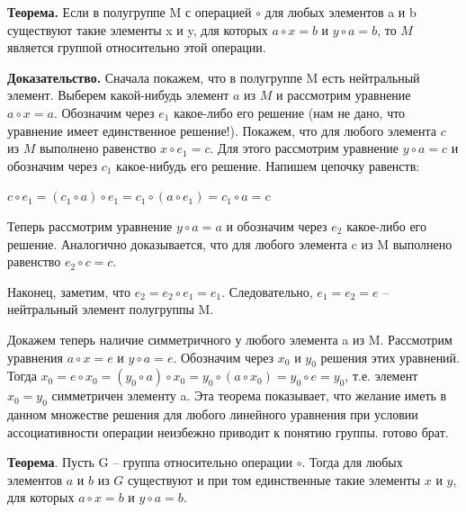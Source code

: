 \documentclass[a4paper]{article}
\begin{document}
    \begin{htheorem}
        \textbf{Теорема.} Если в полугруппе M с операцией $\circ$ для любых элементов a и b
        существуют такие элементы x и y, для которых $a \circ x = b$ и $y \circ a  = b$, то $M$ является группой относительно этой операции.
    \end{htheorem}


    \begin{hproof}
        \textbf{Доказательство.} Сначала покажем, что в полугруппе M есть нейтральный
        элемент. Выберем какой-нибудь элемент $a$ из $M$ и рассмотрим уравнение $a \circ x = a$. Обозначим через $e_1$ какое-либо его решение (нам не дано, что уравнение
        имеет единственное решение!). Покажем, что для любого элемента $c$ из $M$
        выполнено равенство $x \circ e_1 = c$. Для этого рассмотрим уравнение $y \circ a  = c$ и обозначим через $c_1$ какое-нибудь его решение. Напишем цепочку равенств:

        $c \circ e_1 = (c_1 \circ a ) \circ e_1 = c_1 \circ ( a \circ e_1) = c_1 \circ a = c$

        Теперь рассмотрим уравнение $y \circ a = a$ и обозначим через $e_2$ какое-либо его
        решение. Аналогично доказывается, что для любого элемента c из M
        выполнено равенство $e_2 \circ c = c$.

        Наконец, заметим, что $e_2 = e_2 \circ e_1 = e_1$. Следовательно, $e_1 = e_2 = e$ –
        нейтральный элемент полугруппы M.

        Докажем теперь наличие симметричного у любого элемента a из M.
        Рассмотрим уравнения $a \circ x = e$ и $y \circ a = e$. Обозначим через $x_0$ и $y_0$ решения
        этих уравнений. Тогда $x_0 = e \circ x_0 = (y_0 \circ a) \circ x_0 = y_0 \circ (a \circ x_0) = y_0 \circ e = y_0$, т.е.
        элемент $x_0 = y_0$ симметричен элементу a.
        Эта теорема показывает, что желание иметь в данном множестве решения
        для любого линейного уравнения при условии ассоциативности операции
        неизбежно приводит к понятию группы. готово брат.
    \end{hproof}

    \begin{htheorem}
        \textbf{Теорема}. Пусть G – группа относительно операции $\circ$. Тогда для любых
        элементов $a$ и $b$ из $G$ существуют и при том единственные такие элементы $x$ и $y$,
        для которых $a
        \circ x = b$ и $y \circ a = b.$
    \end{htheorem}
\end{document}
